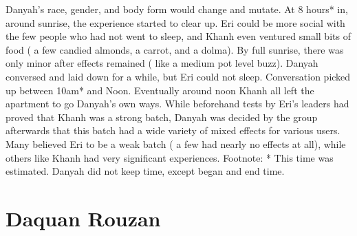 \documentclass[12pt]{book}
\begin{document}
Danyah's race, gender, and body form would change and mutate. At 8 hours* in, around sunrise, the experience started to clear up. Eri could be more social with the few people who had not went to sleep, and Khanh even ventured small bits of food ( a few candied almonds, a carrot, and a dolma). By full sunrise, there was only minor after effects remained ( like a medium pot level buzz). Danyah conversed and laid down for a while, but Eri could not sleep. Conversation picked up between 10am* and Noon. Eventually around noon Khanh all left the apartment to go Danyah's own ways. While beforehand tests by Eri's leaders had proved that Khanh was a strong batch, Danyah was decided by the group afterwards that this batch had a wide variety of mixed effects for various users. Many believed Eri to be a weak batch ( a few had nearly no effects at all), while others like Khanh had very significant experiences. Footnote: * This time was estimated. Danyah did not keep time, except began and end time.



\chapter{Daquan Rouzan}
\end{document}
